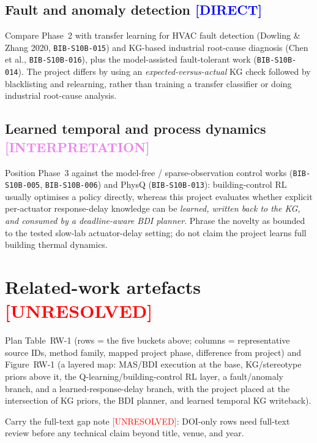 \documentclass[12pt, a4paper, oneside]{memoir}
\newcommand{\evDirect}{\textcolor{blue}{[DIRECT]}}
\newcommand{\evInterp}{\textcolor{violet}{[INTERPRETATION]}}
\newcommand{\evUnresolved}{\textcolor{red}{[UNRESOLVED]}}
\begin{document}
\subsection{Fault and anomaly detection \evDirect}

Compare Phase~2 with transfer learning for HVAC fault detection (Dowling \&
Zhang 2020, \texttt{BIB-S10B-015}) and KG-based industrial root-cause
diagnosis (Chen et al., \texttt{BIB-S10B-016}), plus the model-assisted
fault-tolerant work (\texttt{BIB-S10B-014}).  The project differs by using an
\emph{expected-versus-actual} KG check followed by blacklisting and
relearning, rather than training a transfer classifier or doing industrial
root-cause analysis.

\subsection{Learned temporal and process dynamics \evInterp}

Position Phase~3 against the model-free / sparse-observation control works
(\texttt{BIB-S10B-005}, \texttt{BIB-S10B-006}) and PhysQ
(\texttt{BIB-S10B-013}): building-control RL usually optimises a policy
directly, whereas this project evaluates whether explicit per-actuator
response-delay knowledge can be \emph{learned, written back to the KG, and
consumed by a deadline-aware BDI planner}.  Phrase the novelty as bounded to
the tested slow-lab actuator-delay setting; do not claim the project learns
full building thermal dynamics.

\section{Related-work artefacts \evUnresolved}
\label{sec:bg-artefacts}

Plan Table~RW-1 (rows = the five buckets above; columns = representative
source IDs, method family, mapped project phase, difference from project)
and Figure~RW-1 (a layered map: MAS/BDI execution at the base, KG/stereotype
priors above it, the Q-learning/building-control RL layer, a fault/anomaly
branch, and a learned-response-delay branch, with the project placed at the
intersection of KG priors, the BDI planner, and learned temporal KG
writeback).

Carry the full-text gap note \evUnresolved: DOI-only rows need full-text
review before any technical claim beyond title, venue, and year.

\end{document}
